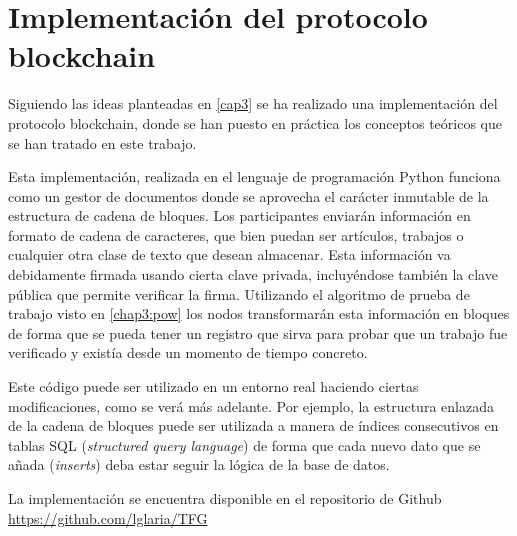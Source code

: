 \cleardoublepage

\chapter{Implementación del protocolo blockchain}\label{implementacion}
Siguiendo las ideas planteadas en \ref{cap3} se ha realizado una implementación del protocolo blockchain, donde se han puesto en práctica los conceptos teóricos que se han tratado en este trabajo. 


Esta implementación, realizada en el lenguaje de programación Python funciona como un gestor de documentos donde se aprovecha el carácter inmutable de la estructura de cadena de bloques. Los participantes enviarán información en formato de cadena de caracteres, que bien puedan ser artículos, trabajos o cualquier otra clase de texto que desean almacenar. Esta información va debidamente firmada usando cierta clave privada, incluyéndose también la clave pública que permite verificar la firma. Utilizando el algoritmo de prueba de trabajo visto en \ref{chap3:pow} los nodos transformarán esta información en bloques de forma que se pueda tener un registro que sirva para probar que un trabajo fue verificado y existía desde un momento de tiempo concreto.

Este código puede ser utilizado en un entorno real haciendo ciertas modificaciones, como se verá más adelante. Por ejemplo, la estructura enlazada de la cadena de bloques puede ser utilizada a manera de índices consecutivos en tablas SQL (\textit{structured query language}) de forma que cada nuevo dato que se añada (\textit{inserts}) deba estar seguir la lógica de la base de datos.



La implementación se encuentra disponible en el repositorio de Github \url{https://github.com/lglaria/TFG}

